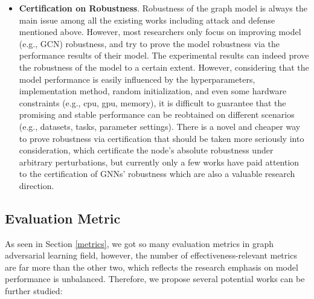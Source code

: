 \begin{itemize}
	\item \textbf{Certification on Robustness}. Robustness of the graph model is always the main issue among all the existing works including attack and defense mentioned above. However, most researchers only focus on improving model (e.g., GCN) robustness, and try to prove the model robustness via the performance results of their model. The experimental results can indeed prove the robustness of the model to a certain extent. However, considering that the model performance is easily influenced by the hyperparameters, implementation method, random initialization, and even some hardware constraints (e.g., cpu, gpu, memory), it is difficult to guarantee that the promising and stable performance can be reobtained on different scenarios (e.g., datasets, tasks, parameter settings). There is a novel and cheaper way to prove robustness via certification that should be taken more seriously into consideration, which certificate the node's absolute robustness under arbitrary perturbations, but currently only a few works have paid attention to the certification of GNNs' robustness \cite{zugner2019certifiable,bojchevski2019certifiable} which are also a valuable research direction.

\end{itemize}

\subsection{Evaluation Metric}
As seen in Section \ref{metrics}, we got so many evaluation metrics in graph adversarial learning field, however, the number of effectiveness-relevant metrics are far more than the other two, which reflects the research emphasis on model performance is unbalanced. Therefore, we propose several potential works can be further studied:

